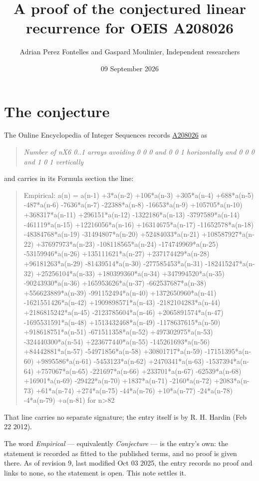 \documentclass[11pt]{article}
\title{A proof of the conjectured linear recurrence for OEIS A208026}
\author{Adrian Perez Fontelles and Gaspard Moulinier, Independent researchers}
\date{09 September 2026}
\theoremstyle{definition}
\begin{document}
\maketitle
\section{The conjecture}

The Online Encyclopedia of Integer Sequences records \href{https://oeis.org/A208026}{A208026} as

\begin{quote}\itshape Number of nX6 0..1 arrays avoiding 0 0 0 and 0 0 1 horizontally and 0 0 0 and 1 0 1 vertically\end{quote}

and carries in its Formula section the line:

\begin{quote}\ttfamily Empirical: a(n) = a(n-1) +3*a(n-2) +106*a(n-3) +305*a(n-4) +688*a(n-5) -487*a(n-6) -7636*a(n-7) -22388*a(n-8) -16653*a(n-9) +105705*a(n-10) +368317*a(n-11) +296151*a(n-12) -1322186*a(n-13) -3797589*a(n-14) -461119*a(n-15) +12216056*a(n-16) +16314675*a(n-17) -11652578*a(n-18) -48384768*a(n-19) -31494807*a(n-20) +52484033*a(n-21) +108587927*a(n-22) +37697973*a(n-23) -108118565*a(n-24) -174749969*a(n-25) -53159946*a(n-26) +135111621*a(n-27) +237174429*a(n-28) +96181263*a(n-29) -81439514*a(n-30) -277585453*a(n-31) -182415247*a(n-32) +25256104*a(n-33) +180399360*a(n-34) +347994520*a(n-35) -90243930*a(n-36) +165953626*a(n-37) -662537687*a(n-38) +556623889*a(n-39) -991152494*a(n-40) +1372650960*a(n-41) -1621551426*a(n-42) +1909898571*a(n-43) -2182104283*a(n-44) +2186815242*a(n-45) -2123785604*a(n-46) +2065891574*a(n-47) -1695531591*a(n-48) +1513432468*a(n-49) -1178637615*a(n-50) +918618751*a(n-51) -671511358*a(n-52) +497302975*a(n-53) -324440300*a(n-54) +223677440*a(n-55) -145261693*a(n-56) +84442881*a(n-57) -54971856*a(n-58) +30801717*a(n-59) -17151395*a(n-60) +9895586*a(n-61) -5453123*a(n-62) +2470341*a(n-63) -1537394*a(n-64) +757067*a(n-65) -221697*a(n-66) +233701*a(n-67) -62539*a(n-68) +16901*a(n-69) -29422*a(n-70) +1837*a(n-71) -2160*a(n-72) +2083*a(n-73) +61*a(n-74) +274*a(n-75) -44*a(n-76) +10*a(n-77) -24*a(n-78) -4*a(n-79) +a(n-81) for n>82\end{quote}

That line carries no separate signature; the entry itself is by R. H. Hardin (Feb 22 2012).

The word {\itshape Empirical} --- equivalently {\itshape Conjecture} --- is the entry's own: the statement is recorded as fitted to the published terms, and no proof is given there. As of revision 9, last modified Oct 03 2025, the entry records no proof and links to none, so the statement is open. This note settles it.
\end{document}
